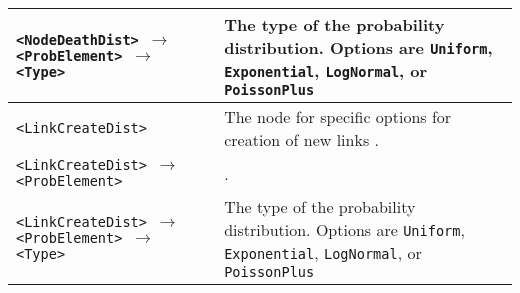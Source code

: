 {\begin{longtable}{ | p{7.5cm} | p{6.5cm} | }
\hline
\footnotesize{\texttt{<NodeDeathDist> $\rightarrow$ <ProbElement> $\rightarrow$ <Type>}} &
The type of the probability distribution.
\newline
Options are \texttt{Uniform}, \texttt{Exponential}, \texttt{LogNormal}, or \texttt{PoissonPlus}
 \\

\hline 
\hline


\hline 
\footnotesize{\texttt{<LinkCreateDist>}} &
The node for specific options for creation of new links . \\

\hline
\footnotesize{\texttt{<LinkCreateDist> $\rightarrow$ <ProbElement>}} &
. \\

\hline
\footnotesize{\texttt{<LinkCreateDist> $\rightarrow$ <ProbElement> $\rightarrow$ <Type>}} &
The type of the probability distribution.
\newline
Options are \texttt{Uniform}, \texttt{Exponential}, \texttt{LogNormal}, or \texttt{PoissonPlus}
 \\

\hline


\end{longtable}



\normalsize

}
